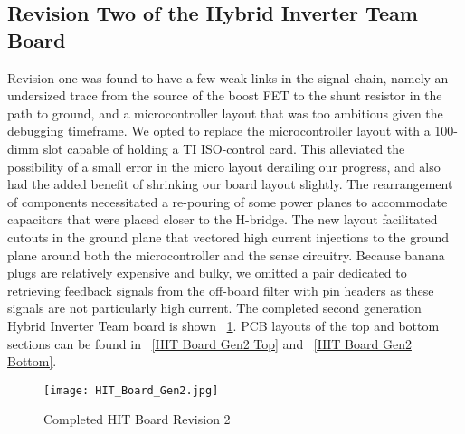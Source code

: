 \subsection{Revision Two of the Hybrid Inverter Team Board}
Revision one was found to have a few weak links in the signal chain, namely an undersized trace from the source of the boost FET to the shunt resistor in the path to ground, and a microcontroller layout that was too ambitious given the debugging timeframe. We opted to replace the microcontroller layout with a 100-dimm slot capable of holding a TI ISO-control card. This alleviated the possibility of a small error in the micro layout derailing our progress, and also had the added benefit of shrinking our board layout slightly. The rearrangement of components necessitated a re-pouring of some power planes to accommodate capacitors that were placed closer to the H-bridge. The new layout facilitated cutouts in the ground plane that vectored high current injections to the ground plane around both the microcontroller and the sense circuitry. Because banana plugs are relatively expensive and bulky, we omitted a pair dedicated to retrieving feedback signals from the off-board filter with pin headers as these signals are not particularly high current. The completed second generation Hybrid Inverter Team board is shown ~\ref{HIT Board Gen2}. PCB layouts of the top and bottom sections can be found in ~\ref{HIT Board Gen2 Top} and ~\ref{HIT Board Gen2 Bottom}.

\begin{figure}
\centering
\texttt{[image: HIT\_Board\_Gen2.jpg]}
\caption{Completed HIT Board Revision 2}
\label{HIT Board Gen2}
\end{figure}
